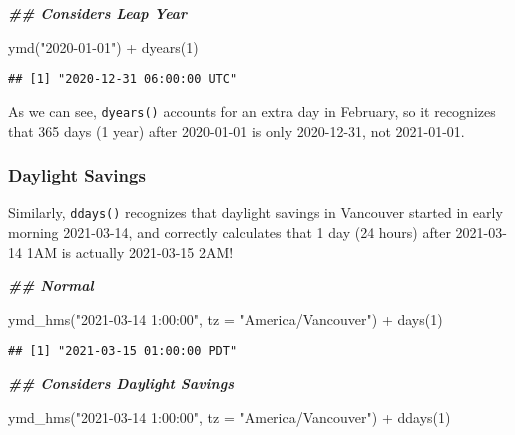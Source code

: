 \documentclass[
]{book}
\newenvironment{Shaded}{\begin{snugshade}}{\end{snugshade}}
\newcommand{\AttributeTok}[1]{\textcolor[rgb]{0.77,0.63,0.00}{#1}}
\newcommand{\DecValTok}[1]{\textcolor[rgb]{0.00,0.00,0.81}{#1}}
\newcommand{\DocumentationTok}[1]{\textcolor[rgb]{0.56,0.35,0.01}{\textbf{\textit{#1}}}}
\newcommand{\FunctionTok}[1]{\textcolor[rgb]{0.00,0.00,0.00}{#1}}
\newcommand{\NormalTok}[1]{#1}
\newcommand{\SpecialCharTok}[1]{\textcolor[rgb]{0.00,0.00,0.00}{#1}}
\newcommand{\StringTok}[1]{\textcolor[rgb]{0.31,0.60,0.02}{#1}}
\begin{document}
\begin{Shaded}
\begin{Highlighting}[]
\DocumentationTok{\#\# Considers Leap Year}

\FunctionTok{ymd}\NormalTok{(}\StringTok{"2020{-}01{-}01"}\NormalTok{) }\SpecialCharTok{+} \FunctionTok{dyears}\NormalTok{(}\DecValTok{1}\NormalTok{)}
\end{Highlighting}
\end{Shaded}

\begin{verbatim}
## [1] "2020-12-31 06:00:00 UTC"
\end{verbatim}

As we can see, \texttt{dyears()} accounts for an extra day in February, so it recognizes that 365 days (1 year) after 2020-01-01 is only 2020-12-31, not 2021-01-01.

\hypertarget{daylight-savings}{%
\subsubsection{Daylight Savings}\label{daylight-savings}}

Similarly, \texttt{ddays()} recognizes that daylight savings in Vancouver started in early morning 2021-03-14, and correctly calculates that 1 day (24 hours) after 2021-03-14 1AM is actually 2021-03-15 2AM!

\begin{Shaded}
\begin{Highlighting}[]
\DocumentationTok{\#\# Normal}

\FunctionTok{ymd\_hms}\NormalTok{(}\StringTok{"2021{-}03{-}14 1:00:00"}\NormalTok{, }
        \AttributeTok{tz =} \StringTok{"America/Vancouver"}\NormalTok{) }\SpecialCharTok{+} 
    \FunctionTok{days}\NormalTok{(}\DecValTok{1}\NormalTok{)}
\end{Highlighting}
\end{Shaded}

\begin{verbatim}
## [1] "2021-03-15 01:00:00 PDT"
\end{verbatim}

\begin{Shaded}
\begin{Highlighting}[]
\DocumentationTok{\#\# Considers Daylight Savings}

\FunctionTok{ymd\_hms}\NormalTok{(}\StringTok{"2021{-}03{-}14 1:00:00"}\NormalTok{, }
        \AttributeTok{tz =} \StringTok{"America/Vancouver"}\NormalTok{) }\SpecialCharTok{+} 
    \FunctionTok{ddays}\NormalTok{(}\DecValTok{1}\NormalTok{)}
\end{Highlighting}
\end{Shaded}
\end{document}
